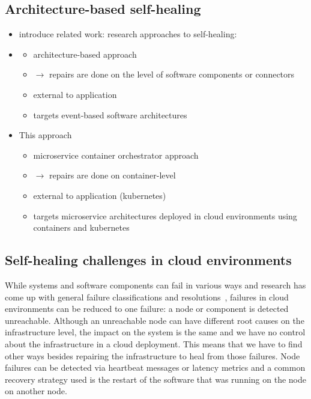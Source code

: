   \subsection{Architecture-based self-healing}
  \begin{itemize}
    \item introduce related work: research approaches to self-healing:
    \item \cite{DashofyArchitecture}
    \begin{itemize}
      \item architecture-based approach
      \item $\rightarrow$ repairs are done on the level of software components or connectors
      \item external to application
      \item targets event-based software architectures
    \end{itemize}
    \item This approach
    \begin{itemize}
      \item microservice container orchestrator approach
      \item $\rightarrow$ repairs are done on container-level
      \item external to application (\gls{kubernetes})
      \item targets microservice architectures deployed in cloud environments using containers and \gls{kubernetes}
    \end{itemize}
  \end{itemize}

\subsection{Self-healing challenges in cloud environments}
  While systems and software components can fail in various ways and research has come up with general failure classifications and resolutions~\cite[Tab.~1]{PsaierSurvey}, failures in cloud environments can be reduced to one failure: a node or component is detected unreachable.
  Although an unreachable node can have different root causes on the infrastructure level, the impact on the system is the same and we have no control about the infrastructure in a cloud deployment.
  This means that we have to find other ways besides repairing the infrastructure to heal from those failures.
  Node failures can be detected via heartbeat messages or latency metrics and a common recovery strategy used is the restart of the software that was running on the node on another node.

